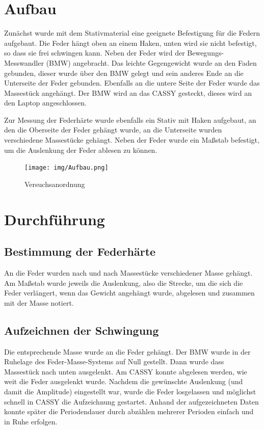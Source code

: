 \section{Aufbau}
Zunächst wurde mit dem Stativmaterial eine geeignete Befestigung für die Federn aufgebaut. Die Feder hängt oben an einem Haken, unten wird sie nicht befestigt, so dass sie frei schwingen kann. Neben der Feder wird der Bewegungs-Messwandler (BMW) angebracht. Das leichte Gegengewicht wurde an den Faden gebunden, dieser wurde über den BMW gelegt und sein anderes Ende an die Unterseite der Feder gebunden. Ebenfalls an die untere Seite der Feder wurde das Massestück angehängt.
Der BMW wird an das CASSY gesteckt, dieses wird an den Laptop angeschlossen.

Zur Messung der Federhärte wurde ebenfalls ein Stativ mit Haken aufgebaut, an den die Oberseite der Feder gehängt wurde, an die Unterseite wurden verschiedene Massestücke gehängt. Neben der Feder wurde ein Maßstab befestigt, um die Auslenkung der Feder ablesen zu können.

\begin{figure}[H]
\centering
\texttt{[image: img/Aufbau.png]}
\caption{Versuchsanordnung}
\end{figure}

\section{Durchführung}
\subsection{Bestimmung der Federhärte}
An die Feder wurden nach und nach Massestücke verschiedener Masse gehängt. Am Maßstab wurde jeweils die Auslenkung, also die Strecke, um die sich die Feder verlängert, wenn das Gewicht angehängt wurde, abgelesen und zusammen mit der Masse notiert.

\subsection{Aufzeichnen der Schwingung}
Die entsprechende Masse wurde an die Feder gehängt. Der BMW wurde in der Ruhelage des Feder-Masse-Systems auf Null gestellt. Dann wurde dass Massestück nach unten ausgelenkt. Am CASSY konnte abgelesen werden, wie weit die Feder ausgelenkt wurde. Nachdem die gewünschte Auslenkung (und damit die Amplitude) eingestellt war, wurde die Feder losgelassen und möglichst schnell in CASSY die Aufzeichnung gestartet. Anhand der aufgezeichneten Daten konnte später die Periodendauer durch abzählen mehrerer Perioden einfach und in Ruhe erfolgen.

